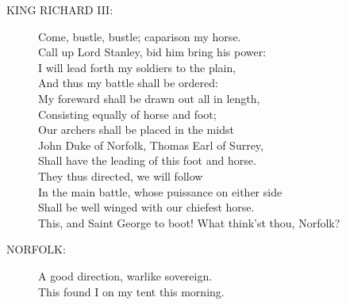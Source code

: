 \documentclass{article}
\begin{document}
\begin{description}
\item[KING RICHARD III:] 
\hspace{1pt}Come, bustle, bustle; caparison my horse.\\
\hspace{1pt}Call up Lord Stanley, bid him bring his power:\\
\hspace{1pt}I will lead forth my soldiers to the plain,\\
\hspace{1pt}And thus my battle shall be ordered:\\
\hspace{1pt}My foreward shall be drawn out all in length,\\
\hspace{1pt}Consisting equally of horse and foot;\\
\hspace{1pt}Our archers shall be placed in the midst\\
\hspace{1pt}John Duke of Norfolk, Thomas Earl of Surrey,\\
\hspace{1pt}Shall have the leading of this foot and horse.\\
\hspace{1pt}They thus directed, we will follow\\
\hspace{1pt}In the main battle, whose puissance on either side\\
\hspace{1pt}Shall be well winged with our chiefest horse.\\
\hspace{1pt}This, and Saint George to boot! What think'st thou, Norfolk?\\
\end{description}
\begin{description}
\item[NORFOLK:] 
\hspace{1pt}A good direction, warlike sovereign.\\
\hspace{1pt}This found I on my tent this morning.\\
\end{description}
\\
\end{document}
